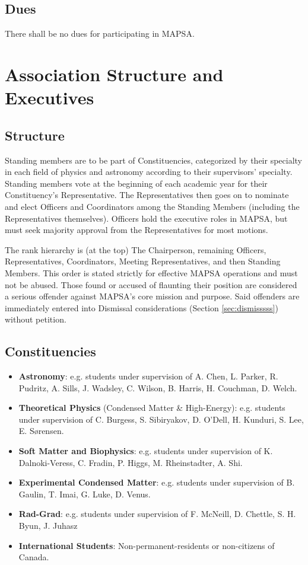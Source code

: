 \documentclass[8pt]{article}
\begin{document}
	\subsection{Dues}
	There shall be no dues for participating in MAPSA.
	
	\section{Association Structure and Executives}
	\subsection{Structure}\label{subsec:structure}
	Standing members are to be part of Constituencies, categorized by their specialty in each field of physics and astronomy according to their supervisors' specialty. Standing members vote at the beginning of each academic year for their Constituency's Representative. The Representatives then goes on to nominate and elect Officers and Coordinators among the Standing Members (including the Representatives themselves). Officers hold the executive roles in MAPSA, but must seek majority approval from the Representatives for most motions. 
	
	\noindent The rank hierarchy is (at the top) The Chairperson, remaining Officers, Representatives, Coordinators, Meeting Representatives, and then Standing Members. This order is stated strictly for effective MAPSA operations and must not be abused. Those found or accused of flaunting their position are considered a serious offender against MAPSA's core mission and purpose. Said offenders are immediately entered into Dismissal considerations (Section \ref{sec:dismisssss}) without petition.
	\subsection{Constituencies}
	\begin{itemize}
		\item \textbf{Astronomy}: e.g. students under supervision of A. Chen, L. Parker, R. Pudritz, A. Sills, J. Wadsley, C. Wilson, B. Harris, H. Couchman, D. Welch.
		\item \textbf{Theoretical Physics} (Condensed Matter \& High-Energy): e.g. students under supervision of C. Burgess, S. Sibiryakov, D. O'Dell, H. Kunduri, S. Lee, E. Sørensen.
		\item \textbf{Soft Matter and Biophysics}: e.g. students under supervision of K. Dalnoki-Veress, C. Fradin, P. Higgs, M. Rheinstadter, A. Shi.
		\item \textbf{Experimental Condensed Matter}: e.g. students under supervision of B. Gaulin, T. Imai, G. Luke, D. Venus.
		\item \textbf{Rad-Grad}: e.g. students under supervision of F. McNeill, D. Chettle, S. H. Byun, J. Juhasz
		\item \textbf{International Students}: Non-permanent-residents or non-citizens of Canada.
	\end{itemize}
	
\end{document}
